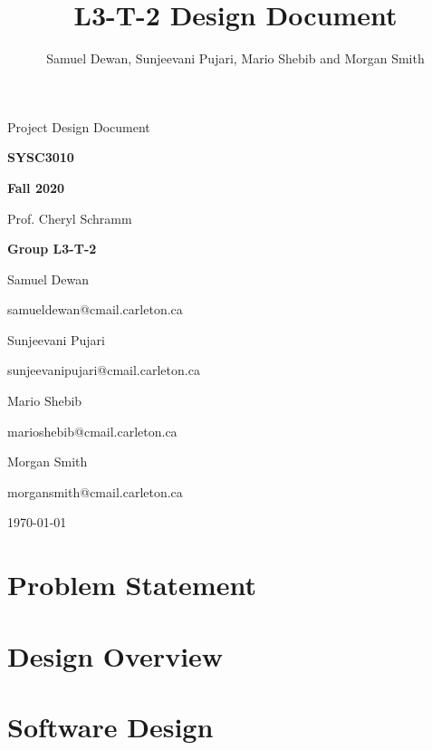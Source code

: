 \documentclass[11pt,letterpaper]{article}
\title{L3-T-2 Design Document}
\author{Samuel Dewan, Sunjeevani Pujari, Mario Shebib and Morgan Smith}
\begin{document}
\frenchspacing

\begin{titlepage}
\centering


{\Huge \sffamily Project Design Document}

{\large \textbf{SYSC3010}}

{\large \textbf{Fall 2020}}

Prof. Cheryl Schramm


{\large \textbf{Group L3-T-2}}

Samuel Dewan

{\footnotesize samueldewan@cmail.carleton.ca}

Sunjeevani Pujari

{\footnotesize sunjeevanipujari@cmail.carleton.ca}

Mario Shebib

{\footnotesize marioshebib@cmail.carleton.ca}

Morgan Smith

{\footnotesize morgansmith@cmail.carleton.ca}


{\large \today}


\end{titlepage}

\tableofcontents
\clearpage
{}

\section{Problem Statement}
\label{sec:problem-statement}

\clearpage

\section{Design Overview}
\label{sec:design-overview}

\clearpage

\section{Software Design}
\label{sec:software-design}

\clearpage
\end{document}
